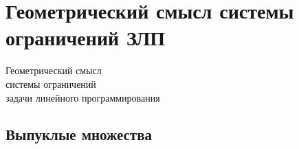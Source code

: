 \documentclass[unicode,11pt,notheorems]{beamer}
\begin{document}
	



\section{Геометрический смысл системы ограничений ЗЛП}

\begin{frame}[t]{}{}
\vspace{2cm}
{\LARGE Геометрический смысл\\ системы ограничений\\ задачи линейного программирования\par}
\vspace{\fill}

\end{frame}   



\subsection{Выпуклые множества}
\end{document}
